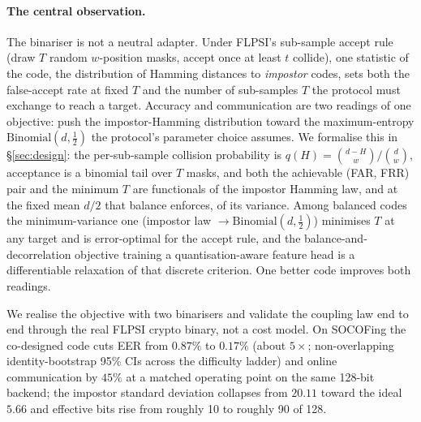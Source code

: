 \paragraph{The central observation.} The binariser is not a neutral adapter. Under FLPSI's sub-sample
accept rule (draw $T$ random $w$-position masks, accept once at least $t$ collide), one statistic of
the code, the distribution of Hamming distances to \emph{impostor} codes, sets both the false-accept
rate at fixed $T$ and the number of sub-samples $T$ the protocol must exchange to reach a target.
Accuracy and communication are two readings of one objective: push the impostor-Hamming distribution
toward the maximum-entropy $\mathrm{Binomial}(d,\tfrac12)$ the protocol's parameter choice assumes. We
formalise this in \S\ref{sec:design}: the per-sub-sample collision probability is $q(H) =
\binom{d-H}{w}/\binom{d}{w}$, acceptance is a binomial tail over $T$ masks, and both the achievable
(FAR, FRR) pair and the minimum $T$ are functionals of the impostor Hamming law, and at the fixed mean
$d/2$ that balance enforces, of its variance. Among balanced codes the minimum-variance one (impostor
law $\to \mathrm{Binomial}(d,\tfrac12)$) minimises $T$ at any target and is error-optimal for the
accept rule, and the balance-and-decorrelation objective training a quantisation-aware feature head is
a differentiable relaxation of that discrete criterion. One better code improves both readings.

We realise the objective with two binarisers and validate the coupling law end to end through the real
FLPSI crypto binary, not a cost model. On SOCOFing the co-designed code cuts EER from $0.87\%$ to
$0.17\%$ (about $5\times$; non-overlapping identity-bootstrap 95\% CIs across the difficulty ladder)
and online communication by $45\%$ at a matched operating point on the same 128-bit backend; the
impostor standard deviation collapses from $20.11$ toward the ideal $5.66$ and effective bits rise from
roughly 10 to roughly 90 of 128.


